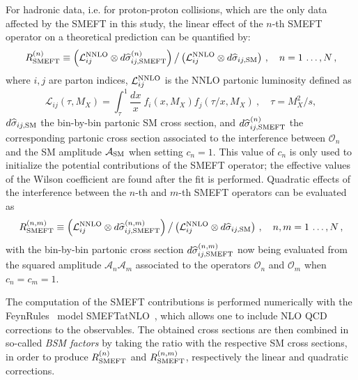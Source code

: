 \documentclass[withindex,glossary]{cam-thesis}
\begin{document}
For hadronic data, i.e. for proton-proton collisions, which are the only data affected by the SMEFT in this study,
 the linear effect of the $n$-th SMEFT operator on a theoretical prediction can be quantified by:
%
\begin{equation}
  \label{eq:mult_k_fac_app1}
   R_{\rm SMEFT}^{(n)} \equiv \displaystyle \left( {\cal L}_{ ij}^{\rm NNLO} \otimes d\widehat{\sigma}_{ij,{\rm SMEFT}}^{(n)}\right)
 \big/ \left( {\cal L}_{ ij}^{\rm NNLO} \otimes d\widehat{\sigma}_{ij,{\rm SM}} \right) \, , \quad
 n=1\,\ldots, N \, ,
\end{equation}
%
where $i, j$ are parton indices, ${\cal L}_{ ij}^{\rm NNLO}$ is the NNLO partonic luminosity defined as 
%
\begin{equation}
\label{eq:lumidef}
\mathcal{L}_{ij}(\tau,M_X) = \int_{\tau}^1 \frac{d x}{x}~f_i (x,M_X) f_j (\tau/x,M_X) ~, \quad \tau=M_X^2/s,
\end{equation}
%
$d\widehat{\sigma}_{ij,{\rm SM}}$ the bin-by-bin partonic SM cross section, and $d\widehat{\sigma}_{ij,{\rm SMEFT}}^{(n)}$
the corresponding partonic cross section associated to the interference between 
$\mathcal{O}_n$ and the SM amplitude $\mathcal{A}_{\rm SM}$ when setting $c_n = 1$. This value of $c_n$ 
is only used to initialize the potential contributions of the
SMEFT operator; the effective values of the Wilson coefficient 
are found after the fit is performed. 
%
Quadratic effects of the interference between the $n$-th and $m$-th
SMEFT operators can be evaluated as
%
\begin{equation}
  \label{eq:mult_k_fac_app2}
  R_{\rm SMEFT}^{(n,m)} \equiv \displaystyle \left( {\cal L}_{ ij}^{\rm NNLO} \otimes d\widehat{\sigma}_{ij,{\rm SMEFT}}^{(n,m)}\right)
  \big/ \left( {\cal L}_{ ij}^{\rm NNLO} \otimes d\widehat{\sigma}_{ij,{\rm SM}} \right) \, , \quad
 n,m=1\,\ldots, N \, ,
\end{equation}
with the bin-by-bin partonic cross section
$d\widehat{\sigma}_{ij,{\rm SMEFT}}^{(n,m)}$ now being evaluated from the squared amplitude $\mathcal{A}_n\mathcal{A}_m$
associated to the operators $\mathcal{O}_n$ and $\mathcal{O}_m$ when $c_n = c_m = 1$.

The computation of the SMEFT contributions is
performed numerically with the FeynRules~\cite{Alloul:2013bka} model SMEFTatNLO~\cite{Degrande:2020evl}, which allows one to include NLO QCD corrections to the observables. The obtained cross sections are then combined in so-called \textit{BSM factors} by taking the ratio with the respective SM cross sections, in order to 
produce $R_{\rm SMEFT}^{(n)}$ and $R_{\rm SMEFT}^{(n,m)}$, respectively the linear and quadratic corrections.
\end{document}
